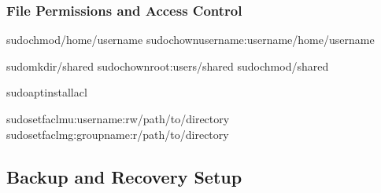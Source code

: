 \documentclass[letterpaper,10pt,english]{sphinxmanual}
\begin{document}
\subsubsection{File Permissions and Access Control}
\label{\detokenize{ubuntu-setup:file-permissions-and-access-control}}
\begin{sphinxVerbatim}[commandchars=\\\{\}]
sudochmod/home/username
sudochownusername:username/home/username

sudomkdir/shared
sudochownroot:users/shared
sudochmod/shared

sudoaptinstallacl

sudosetfacl\PYGZhy{}mu:username:rw/path/to/directory
sudosetfacl\PYGZhy{}mg:groupname:r/path/to/directory
\end{sphinxVerbatim}


\subsection{Backup and Recovery Setup}
\label{\detokenize{ubuntu-setup:backup-and-recovery-setup}}
\end{document}
